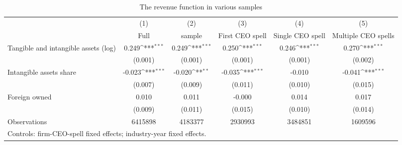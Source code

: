 \begin{table}[htbp]\centering
\def\sym#1{\ifmmode^{#1}\else\(^{#1}\)\fi}
\caption{The revenue function in various samples}
\begin{tabular}{l*{5}{c}}
\hline\hline
                    &\multicolumn{1}{c}{(1)}&\multicolumn{1}{c}{(2)}&\multicolumn{1}{c}{(3)}&\multicolumn{1}{c}{(4)}&\multicolumn{1}{c}{(5)}\\
                    &\multicolumn{1}{c}{Full}&\multicolumn{1}{c}{sample}&\multicolumn{1}{c}{First CEO spell}&\multicolumn{1}{c}{Single CEO spell}&\multicolumn{1}{c}{Multiple CEO spells}\\
\hline
Tangible and intangible assets (log)&       0.249\sym{***}&       0.249\sym{***}&       0.250\sym{***}&       0.246\sym{***}&       0.270\sym{***}\\
                    &     (0.001)         &     (0.001)         &     (0.001)         &     (0.001)         &     (0.002)         \\
[1em]
Intangible assets share&      -0.023\sym{***}&      -0.020\sym{**} &      -0.035\sym{***}&      -0.010         &      -0.041\sym{***}\\
                    &     (0.007)         &     (0.009)         &     (0.011)         &     (0.010)         &     (0.015)         \\
[1em]
Foreign owned       &       0.010         &       0.011         &      -0.000         &       0.014         &       0.017         \\
                    &     (0.009)         &     (0.011)         &     (0.015)         &     (0.010)         &     (0.014)         \\
\hline
Observations        &     6415898         &     4183377         &     2930993         &     3484851         &     1609596         \\
\hline\hline
\multicolumn{6}{l}{\footnotesize Controls: firm-CEO-spell fixed effects; industry-year fixed effects.}\\
\end{tabular}
\end{table}
